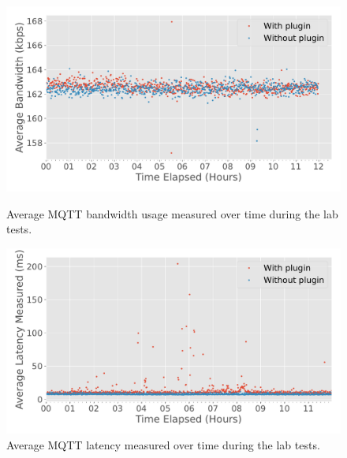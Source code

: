 \begin{figure}[H]
    \begin{minipage}{0.49\linewidth}
        \centering
        \includegraphics[width=\linewidth]{images/labtest_mqtt_bandwidth.pdf}
        \caption{Average \acs{MQTT} bandwidth usage measured over time during the lab tests.}
        \label{fig:labtest-mqtt-bandwidth}
    \end{minipage}
    \hspace{0.02\linewidth}
    \begin{minipage}{0.49\linewidth}
        \centering
        \includegraphics[width=\linewidth]{images/labtest_mqtt_latency.pdf}
        \caption{Average \acs{MQTT} latency measured over time during the lab tests.}
        \label{fig:labtest-mqtt-latency}
    \end{minipage}
    
\end{figure}

